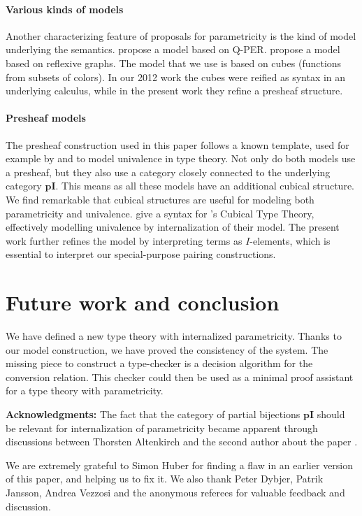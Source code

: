 \documentclass[english]{PaperTools/latex/entcs}
\theoremstyle{plain}
\theoremstyle{definition}
\theoremstyle{remark}
\def\pI{\ensuremath{\mathbf{pI}}}
\begin{document}
\paragraph{Various kinds of models}
Another characterizing feature of proposals for parametricity is the
kind of model underlying the
semantics.  propose a model
based on Q-PER.  propose a model based
on reflexive graphs. The model that we use is based on cubes
(functions from subsets of colors). In
our 2012 work the cubes were reified as syntax in
an underlying calculus, while in the present work they refine a presheaf structure.

\paragraph{Presheaf models}
The presheaf construction used in this paper follows a known template,
used for example by \citet{bezem2014model} and \citet{DBLP:journals/corr/Pitts14}
to model univalence in type theory. Not only do both models use a
presheaf, but they also use a category closely connected to the
underlying category $\pI$.
This means as all these models have an additional cubical structure.
We find remarkable that cubical structures are useful for modeling both
parametricity and univalence.
\citet{altenkirch2014syntax} give a syntax for
\citeauthor{bezem2014model}'s Cubical Type Theory, effectively modelling
univalence by internalization of their model.
The present work further refines the model by interpreting terms as
$I$-elements, which is essential to interpret our special-purpose
pairing constructions.

\section{Future work and conclusion}
We have defined a new type theory with internalized parametricity.
Thanks to our model construction, we have proved the consistency of
the system. The missing piece to construct a type-checker is a
decision algorithm for the conversion relation.  This checker could
then be used as a minimal proof assistant for a type theory with
parametricity.

\bigskip
\noindent
\textbf{Acknowledgments:}
The fact that the category of partial bijections \pI{} should be
relevant for internalization of parametricity became apparent through
discussions between Thorsten Altenkirch and the second  author about
the paper \citep{bernardy_computational_2012}.

We are extremely grateful to Simon Huber for finding a flaw in an
earlier version of this paper, and helping us to fix it.
We also thank Peter Dybjer, Patrik Jansson, Andrea Vezzosi and the
anonymous referees for valuable feedback and discussion.

\newcommand{\newblock}{}


\end{document}
